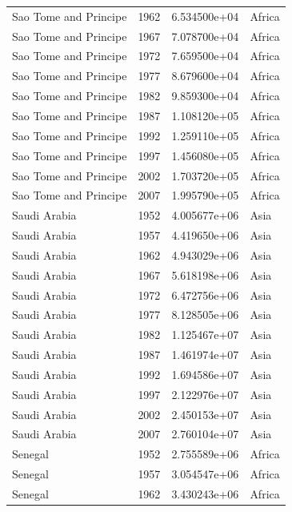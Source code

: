 \documentclass[
  letterpaper,
  DIV=11,
  numbers=noendperiod]{scrreprt}
\begin{document}
\begin{tcolorbox}
\begin{tabular}{lrrl}
Sao Tome and Principe    &  1962 &  6.534500e+04 &    Africa \\
Sao Tome and Principe    &  1967 &  7.078700e+04 &    Africa \\
Sao Tome and Principe    &  1972 &  7.659500e+04 &    Africa \\
Sao Tome and Principe    &  1977 &  8.679600e+04 &    Africa \\
Sao Tome and Principe    &  1982 &  9.859300e+04 &    Africa \\
Sao Tome and Principe    &  1987 &  1.108120e+05 &    Africa \\
Sao Tome and Principe    &  1992 &  1.259110e+05 &    Africa \\
Sao Tome and Principe    &  1997 &  1.456080e+05 &    Africa \\
Sao Tome and Principe    &  2002 &  1.703720e+05 &    Africa \\
Sao Tome and Principe    &  2007 &  1.995790e+05 &    Africa \\
Saudi Arabia             &  1952 &  4.005677e+06 &      Asia \\
Saudi Arabia             &  1957 &  4.419650e+06 &      Asia \\
Saudi Arabia             &  1962 &  4.943029e+06 &      Asia \\
Saudi Arabia             &  1967 &  5.618198e+06 &      Asia \\
Saudi Arabia             &  1972 &  6.472756e+06 &      Asia \\
Saudi Arabia             &  1977 &  8.128505e+06 &      Asia \\
Saudi Arabia             &  1982 &  1.125467e+07 &      Asia \\
Saudi Arabia             &  1987 &  1.461974e+07 &      Asia \\
Saudi Arabia             &  1992 &  1.694586e+07 &      Asia \\
Saudi Arabia             &  1997 &  2.122976e+07 &      Asia \\
Saudi Arabia             &  2002 &  2.450153e+07 &      Asia \\
Saudi Arabia             &  2007 &  2.760104e+07 &      Asia \\
Senegal                  &  1952 &  2.755589e+06 &    Africa \\
Senegal                  &  1957 &  3.054547e+06 &    Africa \\
Senegal                  &  1962 &  3.430243e+06 &    Africa \\

\end{tabular}
\end{tcolorbox}
\end{document}
